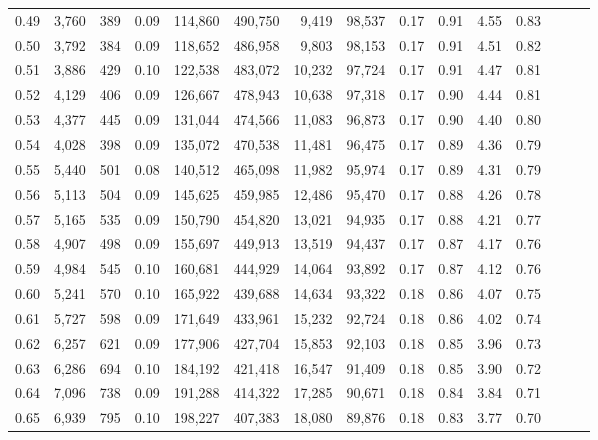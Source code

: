 \begin{tabular}{rrrrrrrrrrrrrrr}
0.49 &   3,760 &    389 &  0.09 &  114,860 &  490,750 &    9,419 &   98,537 &  0.17 &  0.91 &  4.55 &      0.83 \\
0.50 &   3,792 &    384 &  0.09 &  118,652 &  486,958 &    9,803 &   98,153 &  0.17 &  0.91 &  4.51 &      0.82 \\
0.51 &   3,886 &    429 &  0.10 &  122,538 &  483,072 &   10,232 &   97,724 &  0.17 &  0.91 &  4.47 &      0.81 \\
0.52 &   4,129 &    406 &  0.09 &  126,667 &  478,943 &   10,638 &   97,318 &  0.17 &  0.90 &  4.44 &      0.81 \\
0.53 &   4,377 &    445 &  0.09 &  131,044 &  474,566 &   11,083 &   96,873 &  0.17 &  0.90 &  4.40 &      0.80 \\
0.54 &   4,028 &    398 &  0.09 &  135,072 &  470,538 &   11,481 &   96,475 &  0.17 &  0.89 &  4.36 &      0.79 \\
0.55 &   5,440 &    501 &  0.08 &  140,512 &  465,098 &   11,982 &   95,974 &  0.17 &  0.89 &  4.31 &      0.79 \\
0.56 &   5,113 &    504 &  0.09 &  145,625 &  459,985 &   12,486 &   95,470 &  0.17 &  0.88 &  4.26 &      0.78 \\
0.57 &   5,165 &    535 &  0.09 &  150,790 &  454,820 &   13,021 &   94,935 &  0.17 &  0.88 &  4.21 &      0.77 \\
0.58 &   4,907 &    498 &  0.09 &  155,697 &  449,913 &   13,519 &   94,437 &  0.17 &  0.87 &  4.17 &      0.76 \\
0.59 &   4,984 &    545 &  0.10 &  160,681 &  444,929 &   14,064 &   93,892 &  0.17 &  0.87 &  4.12 &      0.76 \\
0.60 &   5,241 &    570 &  0.10 &  165,922 &  439,688 &   14,634 &   93,322 &  0.18 &  0.86 &  4.07 &      0.75 \\
0.61 &   5,727 &    598 &  0.09 &  171,649 &  433,961 &   15,232 &   92,724 &  0.18 &  0.86 &  4.02 &      0.74 \\
0.62 &   6,257 &    621 &  0.09 &  177,906 &  427,704 &   15,853 &   92,103 &  0.18 &  0.85 &  3.96 &      0.73 \\
0.63 &   6,286 &    694 &  0.10 &  184,192 &  421,418 &   16,547 &   91,409 &  0.18 &  0.85 &  3.90 &      0.72 \\
0.64 &   7,096 &    738 &  0.09 &  191,288 &  414,322 &   17,285 &   90,671 &  0.18 &  0.84 &  3.84 &      0.71 \\
0.65 &   6,939 &    795 &  0.10 &  198,227 &  407,383 &   18,080 &   89,876 &  0.18 &  0.83 &  3.77 &      0.70 \\

\end{tabular}

